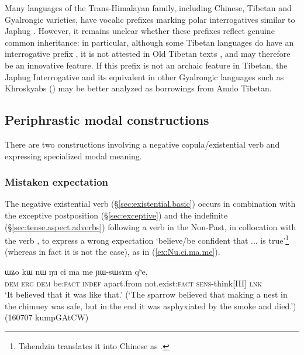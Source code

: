 Many languages of the Trans-Himalayan family, including Chinese, Tibetan and Gyalrongic varieties, have vocalic prefixes marking polar interrogatives similar to Japhug  \citep{sunhk96yiwen}. However, it remains unclear whether these prefixes reflect genuine common inheritance: in particular, although some Tibetan languages do have an interrogative prefix , it is not attested in Old Tibetan texts \citep{hoshi12e}, and may therefore be an innovative feature. If this prefix is not an archaic feature in Tibetan,  the Japhug Interrogative  and its equivalent in other Gyalrongic languages such as Khroskyabs  (\citealt[340]{lai17khroskyabs}) may be better analyzed as borrowings from Amdo Tibetan.


\subsection{Periphrastic modal constructions} \label{sec:cimame.cinAmaRkW}
There are two constructions involving a negative copula/existential verb and expressing specialized modal meaning.

\subsubsection{Mistaken expectation} \label{sec:cimame}
The negative existential verb   (§\ref{sec:existential.basic}) occurs in combination with the exceptive postposition  (§\ref{sec:exceptive}) and the indefinite  (§\ref{sec:tense.aspect.adverbs}) following a verb in the Non-Past, in collocation with the verb , to express a wrong expectation `believe/be confident that ... is true'\footnote{Tshendzin translates it into Chinese as . } (whereas in fact it is not the case), as in (\ref{ex:Nu.ci.ma.me}). 


\begin{exe}
	\ex \label{ex:Nu.ci.ma.me}
	\gll ɯʑo kɯ nɯ ŋu ci ma me ɲɯ-sɯsɤm qʰe,  \\
	\textsc{dem} \textsc{erg} \textsc{dem} be:\textsc{fact} \textsc{indef} apart.from  not.exist:\textsc{fact} \textsc{sens}-think[III] \textsc{lnk} \\
	\glt `It believed that it was like that.'  (`The sparrow believed that making a nest in the chimney was safe, but in the end it was asphyxiated by the smoke and died.') (160707 kumpGAtCW)
\end{exe}

